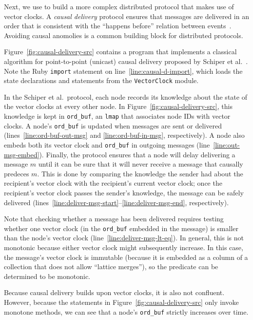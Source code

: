 Next, we use \lang to build a more complex distributed protocol that makes use
of vector clocks. A \emph{causal delivery} protocol ensures that messages are
delivered in an order that is consistent with the ``happens before'' relation
between events~\cite{Lamport1978}. Avoiding causal anomolies is a common
building block for distributed protocols.

Figure~\ref{fig:causal-delivery-src} contains a \lang program that implements a
classical algorithm for point-to-point (unicast) causal delivery proposed by
Schiper et al.~\cite{Schiper1989}. Note the Ruby \texttt{import} statement on
line~\ref{line:causal-d-import}, which loads the \lang state declarations and
statements from the \texttt{VectorClock} module.

In the Schiper et al.\ protocol, each node records its knowledge about the state
of the vector clocks at every other node. In
Figure~\ref{fig:causal-delivery-src}, this knowledge is kept in
\texttt{ord\_buf}, an \texttt{lmap} that associates node IDs with vector
clocks. A node's \texttt{ord\_buf} is updated when messages are sent or
delivered (lines~\ref{line:ord-buf-out-msg} and \ref{line:ord-buf-in-msg},
respectively). A node also embeds both its vector clock and \texttt{ord\_buf} in
outgoing messages (line~\ref{line:out-msg-embed}). Finally, the protocol ensures
that a node will delay delivering a message $m$ until it can be sure that it
will never receive a message that causally predeces $m$. This is done by
comparing the knowledge the sender had about the recipient's vector clock with
the recipient's current vector clock; once the recipient's vector clock passes
the sender's knowledge, the message can be safely delivered
(lines~\ref{line:deliver-msg-start}--\ref{line:deliver-msg-end}, respectively).

Note that checking whether a message has been delivered requires testing whether
one vector clock (in the \texttt{ord\_buf} embedded in the message) is smaller
than the node's vector clock (line~\ref{line:deliver-msg-lt-eq}). In general,
this is not monotonic because either vector clock might subsequently
increase. In this case, the message's vector clock is immutable (because it is
embedded as a column of a collection that does not allow ``lattice merges''), so
the predicate can be determined to be monotonic.

Because causal delivery builds upon vector clocks, it is also not
confluent. However, because the statements in
Figure~\ref{fig:causal-delivery-src} only invoke monotone methods, we can see
that a node's \texttt{ord\_buf} strictly increases over time.
